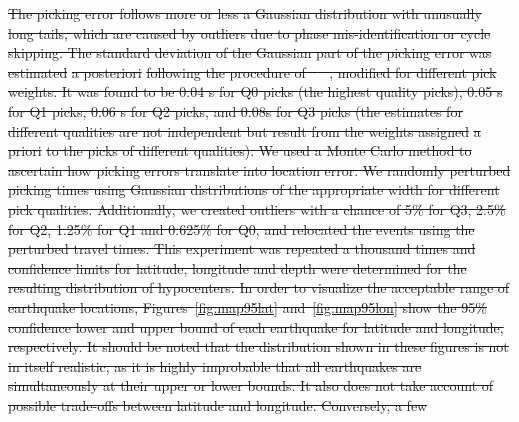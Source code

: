 \documentclass[jgrga]{agu2001} %
\newlength{\tw}
\providecommand{\DIFdel}[1]{{\protect\color{red}\sout{#1}}}                      %
\begin{document}
\begin{article}
\DIFdel{The picking error follows more or less a Gaussian distribution with
unusually long tails, which are caused by outliers due to phase mis-identification
or cycle skipping.   The standard deviation of the Gaussian
part of the picking
error was estimated }%
\DIFdel{a posteriori}%
\DIFdel{following the procedure of \mbox{%
\citet{wilcock91}
}%
,
modified for different pick weights.  It was found to be 0.04 s for
Q0 picks (the highest quality picks), 0.05 s for Q1 picks, 0.06 s for Q2 picks, and 0.08s
for Q3 picks (the estimates for different qualities are not
independent but result from the weights assigned }%
\DIFdel{a priori}%
\DIFdel{to the
picks of different qualities). We  used a Monte Carlo method to ascertain how picking errors
translate into location error. We randomly perturbed picking times
using Gaussian distributions of the appropriate width for different pick
qualities.  Additionally, we created outliers with
a chance of 5\% for Q3, 2.5\% for Q2, 1.25\% for Q1 and 0.625\% for
Q0, and relocated the events using the perturbed travel times. This
experiment was repeated a thousand times and confidence limits for
latitude, longitude and depth were determined for the resulting distribution of
hypocenters.  
 In order to visualize the acceptable range
of earthquake locations, Figures~\ref{fig:map95lat}
and~\ref{fig:map95lon} show the 95\% confidence lower and upper bound of each
earthquake for latitude and longitude, respectively. It should be
noted that the distribution shown in these figures is not in itself realistic, as it is
highly improbable that all earthquakes are simultaneously at their
upper or lower bounds. It also does not take account of possible
trade-offs between latitude and longitude.  Conversely, a few
}
\end{article}
\end{document}
